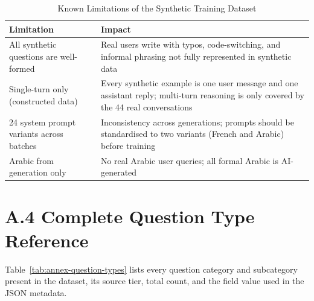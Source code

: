 \renewcommand{\arraystretch}{1.3}
\begin{table}[H]
\centering
\caption{Known Limitations of the Synthetic Training Dataset}
\label{tab:annex-limitations}
\begin{tabular}{|p{5cm}|p{8cm}|}
\hline
\textbf{Limitation} & \textbf{Impact} \\
\hline
All synthetic questions are well-formed & Real users write with typos, code-switching, and informal phrasing not fully represented in synthetic data \\
\hline
Single-turn only (constructed data) & Every synthetic example is one user message and one assistant reply; multi-turn reasoning is only covered by the 44 real conversations \\
\hline
24 system prompt variants across batches & Inconsistency across generations; prompts should be standardised to two variants (French and Arabic) before training \\
\hline
Arabic from generation only & No real Arabic user queries; all formal Arabic is AI-generated \\
\hline
\end{tabular}
\end{table}

\section*{A.4 \quad Complete Question Type Reference}

Table~\ref{tab:annex-question-types} lists every question category and subcategory present in the dataset, its source tier, total count, and the field value used in the JSON metadata.


